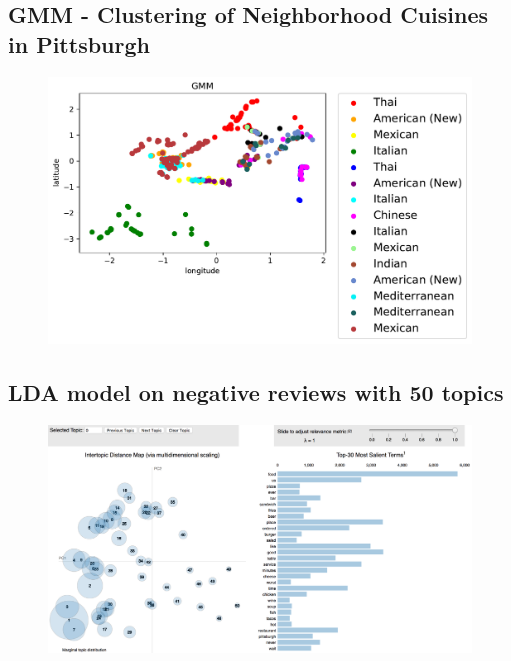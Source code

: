 \documentclass{neu_handout}
\begin{document}
\subsection{GMM - Clustering of Neighborhood Cuisines in Pittsburgh}
\begin{figure}[h]
\centering
{
\includegraphics[width=0.5\linewidth]{gmm_cuisines}
}
\end{figure}

\subsection{LDA model on negative reviews with 50 topics}
\begin{figure}[h]
\centering
{
\includegraphics[width=0.6\linewidth]{first_image}
}
\end{figure}
\end{document}
